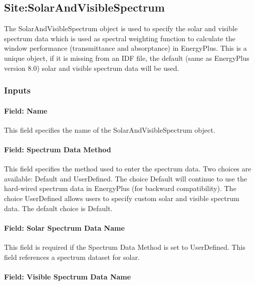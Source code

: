 \subsection{Site:SolarAndVisibleSpectrum}\label{sitesolarandvisiblespectrum}

The SolarAndVisibleSpectrum object is used to specify the solar and visible spectrum data which is used as spectral weighting function to calculate the window performance (transmittance and absorptance) in EnergyPlus. This is a unique object, if it is missing from an IDF file, the default (same as EnergyPlus version 8.0) solar and visible spectrum data will be used.

\subsubsection{Inputs}\label{inputs-24-001}

\paragraph{Field: Name}\label{field-name-10-008}

This field specifies the name of the SolarAndVisibleSpectrum object.

\paragraph{Field: Spectrum Data Method}\label{field-spectrum-data-method}

This field specifies the method used to enter the spectrum data. Two choices are available: Default and UserDefined. The choice Default will continue to use the hard-wired spectrum data in EnergyPlus (for backward compatibility). The choice UserDefined allows users to specify custom solar and visible spectrum data. The default choice is Default.

\paragraph{Field: Solar Spectrum Data Name}\label{field-solar-spectrum-data-name}

This field is required if the Spectrum Data Method is set to UserDefined. This field references a spectrum dataset for solar.

\paragraph{Field: Visible Spectrum Data Name}\label{field-visible-spectrum-data-name}

